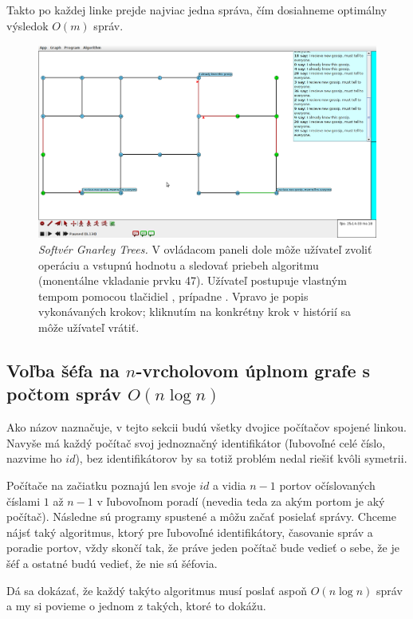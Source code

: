 Takto po každej linke prejde najviac jedna správa, čím dosiahneme optimálny výsledok $O(m)$ správ.

\noindent
\begin{figure}
\centering
\includegraphics[width=2.01\columnwidth]{BFS.png}
\caption{\emph{Softvér Gnarley Trees.} V ovládacom paneli dole môže užívateľ
zvoliť operáciu a vstupnú hodnotu a sledovať priebeh algoritmu (monentálne vkladanie
prvku 47). Užívateľ postupuje vlastným tempom  pomocou tlačidiel , prípadne
. Vpravo je popis vykonávaných krokov; kliknutím na konkrétny krok v histórií
sa môže užívateľ vrátiť.}
\label{img:historia} 
\end{figure}

\subsection{Voľba šéfa na $n$-vrcholovom úplnom grafe s počtom správ $O(n\log n)$}

Ako názov naznačuje, v tejto sekcii budú všetky dvojice počítačov spojené linkou. 
Navyše má každý počítač svoj jednoznačný identifikátor (ľubovoľné celé číslo, nazvime ho $id$), bez identifikátorov
by sa totiž problém nedal riešiť kvôli symetrii.

Počítače na začiatku poznajú len svoje $id$ a vidia $n-1$ portov očíslovaných číslami $1$ až $n-1$ v
ľubovoľnom poradí (nevedia teda za akým portom je aký počítač). Následne sú programy spustené a môžu začať posielať správy.
Chceme nájsť taký algoritmus, ktorý pre ľubovoľné identifikátory, časovanie správ a poradie
portov, vždy skončí tak, že práve jeden počítač bude vedieť o sebe, že je šéf a ostatné budú vedieť, že nie sú šéfovia.

Dá sa dokázať, že každý takýto algoritmus musí poslať aspoň $O(n\log n)$ správ a my si povieme o
jednom z takých, ktoré to dokážu.

